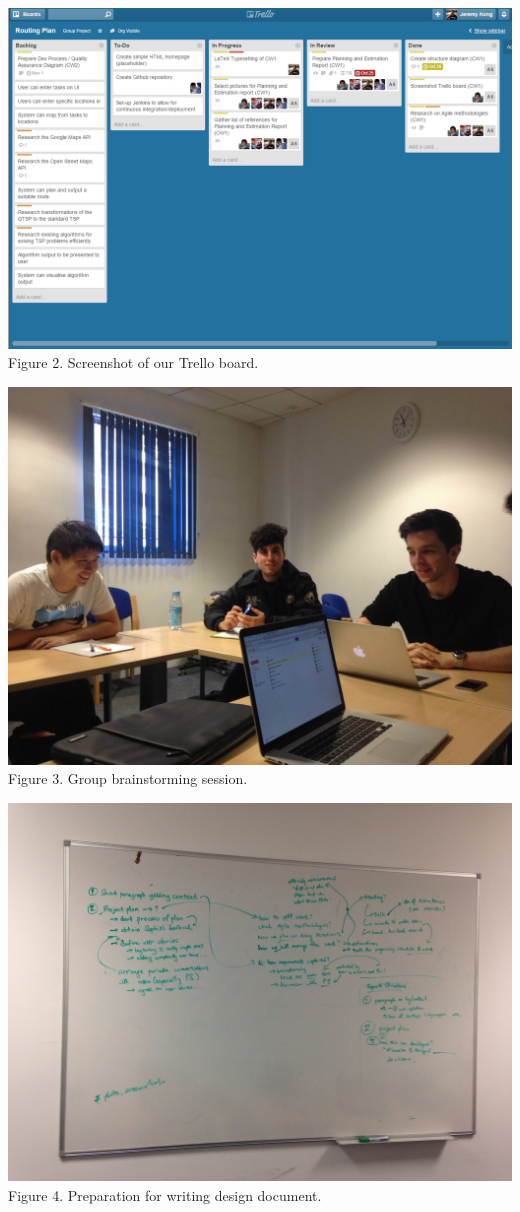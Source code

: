 \documentclass[10pt]{article}
\begin{document}
\begin{center}
\includegraphics[scale=0.3]{trello_board.png}\\
Figure 2. Screenshot of our Trello board.
\end{center}

\begin{center}
\includegraphics[scale=0.2]{meeting.png}\\
Figure 3. Group brainstorming session.
\end{center}

\begin{center}
\includegraphics[scale=0.2]{documentation_process.png}\\
Figure 4. Preparation for writing design document.
\end{center}
\end{document}
